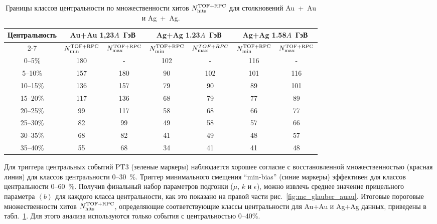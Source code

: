 \begin{table}[]
    \small
    \begin{tabular}{|c|c|c|c|c|c|c|}
    \hline
    \multirow{2}{*}{Центральность} & \multicolumn{2}{c|}{Au+Au 1,23$A$~ГэВ} & \multicolumn{2}{c|}{Ag+Ag 1.23$A$~ГэВ} & \multicolumn{2}{c|}{Ag+Ag 1.58$A$~ГэВ} \\ \cline{2-7} 
                                & $N_{\rm min}^{\rm TOF+RPC}$     & $N_{\rm max}^{\rm TOF+RPC}$     & $N_{\rm min}^{\rm TOF+RPC}$     & $N_{\rm max}^{TOF+RPC}$     & $N_{\rm min}^{\rm TOF+RPC}$     & $N_{\rm max}^{\rm TOF+RPC}$     \\ \hline
    0--5\%                      & 180         & -           & 102         & -           & 116         & -           \\ \hline
    5--10\%                     & 157         & 180         & 90          & 102         & 101         & 116         \\ \hline
    10--15\%                    & 136         & 157         & 79          & 90          & 89          & 101         \\ \hline
    15--20\%                    & 117         & 136         & 68          & 79          & 77          & 89          \\ \hline
    20--25\%                    & 99          & 117         & 58          & 68          & 66          & 77          \\ \hline
    25--30\%                    & 82          & 99          & 49          & 58          & 57          & 66          \\ \hline
    30--35\%                    & 68          & 82          & 41          & 49          & 48          & 57          \\ \hline
    35--40\%                    & 55          & 68          & 34          & 41          & 41          & 48          \\ \hline
    \end{tabular}
\caption{Границы классов центральности по множественности хитов $N_{\rm hits}^{\rm TOF+RPC}$ для столкновений Au~+~Au  и Ag~+~Ag. }
\label{table:centrality_hades}
\end{table}

Для триггера центральных событий PT3 (зеленые маркеры) наблюдается хорошее согласие с восстановленной множественностью (красная линия) для классов центральности 0--30~\%.
Триггер минимального смещения ``min-bias'' (синие маркеры)  эффективен для классов центральности 0--60~\%.
Получив финальный набор параметров подгонки ($\mu$, $k$ и  $\epsilon$), можно извлечь среднее значение прицельного параметра $\left\langle b \right\rangle$ для каждого класса центральности, как это показано на правой части рис.~\ref{fig:mc_glauber_auau}.
Итоговые пороговые множественности хитов $N_{\rm hits}^{\rm TOF+RPC}$, определяющие соответствующие классы центральности для Au+Au и Ag+Ag данных, приведены в табл.~\ref{table:centrality_hades}. 
Для этого анализа используются только события с центральностью 0--40\%.

